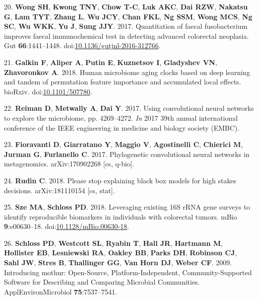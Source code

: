 \documentclass[11pt,]{article}
\begin{document}
\hypertarget{ref-wong_quantitation_2017}{}
20. \textbf{Wong SH}, \textbf{Kwong TNY}, \textbf{Chow T-C}, \textbf{Luk
AKC}, \textbf{Dai RZW}, \textbf{Nakatsu G}, \textbf{Lam TYT},
\textbf{Zhang L}, \textbf{Wu JCY}, \textbf{Chan FKL}, \textbf{Ng SSM},
\textbf{Wong MCS}, \textbf{Ng SC}, \textbf{Wu WKK}, \textbf{Yu J},
\textbf{Sung JJY}. 2017. Quantitation of faecal fusobacterium improves
faecal immunochemical test in detecting advanced colorectal neoplasia.
Gut \textbf{66}:1441--1448.
doi:\href{https://doi.org/10.1136/gutjnl-2016-312766}{10.1136/gutjnl-2016-312766}.

\hypertarget{ref-galkin_human_2018}{}
21. \textbf{Galkin F}, \textbf{Aliper A}, \textbf{Putin E},
\textbf{Kuznetsov I}, \textbf{Gladyshev VN}, \textbf{Zhavoronkov A}.
2018. Human microbiome aging clocks based on deep learning and tandem of
permutation feature importance and accumulated local effects. bioRxiv.
doi:\href{https://doi.org/10.1101/507780}{10.1101/507780}.

\hypertarget{ref-reiman_using_2017}{}
22. \textbf{Reiman D}, \textbf{Metwally A}, \textbf{Dai Y}. 2017. Using
convolutional neural networks to explore the microbiome, pp. 4269--4272.
\emph{In} 2017 39th annual international conference of the IEEE
engineering in medicine and biology society (EMBC).

\hypertarget{ref-fioravanti_phylogenetic_2017}{}
23. \textbf{Fioravanti D}, \textbf{Giarratano Y}, \textbf{Maggio V},
\textbf{Agostinelli C}, \textbf{Chierici M}, \textbf{Jurman G},
\textbf{Furlanello C}. 2017. Phylogenetic convolutional neural networks
in metagenomics. arXiv:170902268 {[}cs, q-bio{]}.

\hypertarget{ref-rudin_please_2018}{}
24. \textbf{Rudin C}. 2018. Please stop explaining black box models for
high stakes decisions. arXiv:181110154 {[}cs, stat{]}.

\hypertarget{ref-sze_leveraging_2018}{}
25. \textbf{Sze MA}, \textbf{Schloss PD}. 2018. Leveraging existing 16S
rRNA gene surveys to identify reproducible biomarkers in individuals
with colorectal tumors. mBio \textbf{9}:e00630--18.
doi:\href{https://doi.org/10.1128/mBio.00630-18}{10.1128/mBio.00630-18}.

\hypertarget{ref-schloss_introducing_2009}{}
26. \textbf{Schloss PD}, \textbf{Westcott SL}, \textbf{Ryabin T},
\textbf{Hall JR}, \textbf{Hartmann M}, \textbf{Hollister EB},
\textbf{Lesniewski RA}, \textbf{Oakley BB}, \textbf{Parks DH},
\textbf{Robinson CJ}, \textbf{Sahl JW}, \textbf{Stres B},
\textbf{Thallinger GG}, \textbf{Van Horn DJ}, \textbf{Weber CF}. 2009.
Introducing mothur: Open-Source, Platform-Independent,
Community-Supported Software for Describing and Comparing Microbial
Communities. ApplEnvironMicrobiol \textbf{75}:7537--7541.
\end{document}
